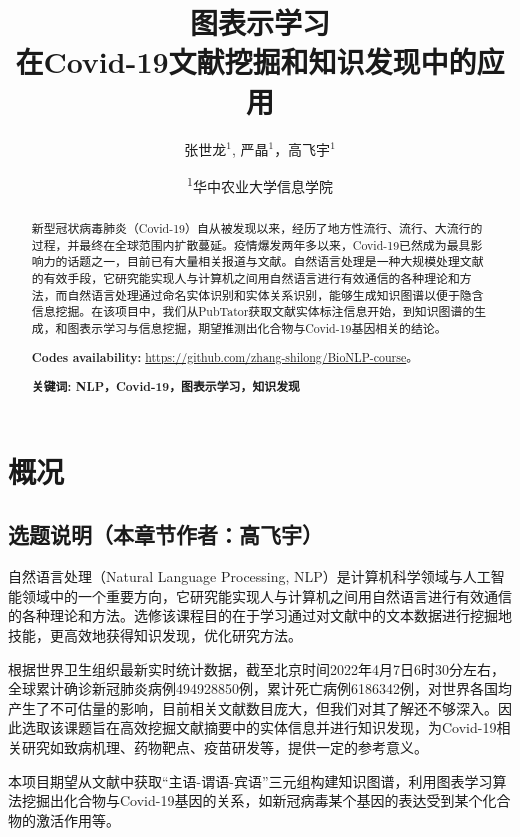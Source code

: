 \documentclass[twocolumn]{article}
\title{图表示学习\\在Covid-19文献挖掘和知识发现中的应用}
\author{张世龙$^{1}$, 严晶$^{1}$，高飞宇$^{1}$}
\date{
\textsuperscript{1}华中农业大学信息学院}
\begin{document}
\maketitle

\begin{abstract}
新型冠状病毒肺炎（Covid-19）自从被发现以来，经历了地方性流行、流行、大流行的过程，并最终在全球范围内扩散蔓延。疫情爆发两年多以来，Covid-19已然成为最具影响力的话题之一，目前已有大量相关报道与文献。自然语言处理是一种大规模处理文献的有效手段，它研究能实现人与计算机之间用自然语言进行有效通信的各种理论和方法，而自然语言处理通过命名实体识别和实体关系识别，能够生成知识图谱以便于隐含信息挖掘。在该项目中，我们从PubTator获取文献实体标注信息开始，到知识图谱的生成，和图表示学习与信息挖掘，期望推测出化合物与Covid-19基因相关的结论。\par
{\bf Codes availability:} \url{https://github.com/zhang-shilong/BioNLP-course}。\par
{\bf 关键词: NLP，Covid-19，图表示学习，知识发现}
\end{abstract}

\maketitle

\section{概况}
\subsection{选题说明（本章节作者：高飞宇）}
自然语言处理（Natural Language Processing, NLP）是计算机科学领域与人工智能领域中的一个重要方向，它研究能实现人与计算机之间用自然语言进行有效通信的各种理论和方法。选修该课程目的在于学习通过对文献中的文本数据进行挖掘地技能，更高效地获得知识发现，优化研究方法。\par
根据世界卫生组织最新实时统计数据，截至北京时间2022年4月7日6时30分左右，全球累计确诊新冠肺炎病例494928850例，累计死亡病例6186342例，对世界各国均产生了不可估量的影响，目前相关文献数目庞大，但我们对其了解还不够深入。因此选取该课题旨在高效挖掘文献摘要中的实体信息并进行知识发现，为Covid-19相关研究如致病机理、药物靶点、疫苗研发等，提供一定的参考意义。\par
本项目期望从文献中获取“主语-谓语-宾语”三元组构建知识图谱，利用图表学习算法挖掘出化合物与Covid-19基因的关系，如新冠病毒某个基因的表达受到某个化合物的激活作用等。\par
\end{document}
